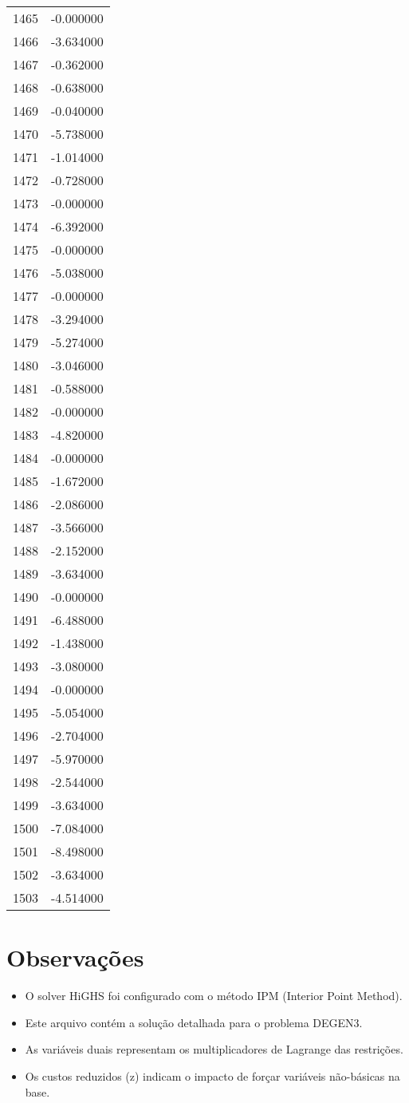 \documentclass[12pt]{article}
\begin{document}
\begin{longtable}{@{}cc@{}}
1465 & -0.000000 \\
1466 & -3.634000 \\
1467 & -0.362000 \\
1468 & -0.638000 \\
1469 & -0.040000 \\
1470 & -5.738000 \\
1471 & -1.014000 \\
1472 & -0.728000 \\
1473 & -0.000000 \\
1474 & -6.392000 \\
1475 & -0.000000 \\
1476 & -5.038000 \\
1477 & -0.000000 \\
1478 & -3.294000 \\
1479 & -5.274000 \\
1480 & -3.046000 \\
1481 & -0.588000 \\
1482 & -0.000000 \\
1483 & -4.820000 \\
1484 & -0.000000 \\
1485 & -1.672000 \\
1486 & -2.086000 \\
1487 & -3.566000 \\
1488 & -2.152000 \\
1489 & -3.634000 \\
1490 & -0.000000 \\
1491 & -6.488000 \\
1492 & -1.438000 \\
1493 & -3.080000 \\
1494 & -0.000000 \\
1495 & -5.054000 \\
1496 & -2.704000 \\
1497 & -5.970000 \\
1498 & -2.544000 \\
1499 & -3.634000 \\
1500 & -7.084000 \\
1501 & -8.498000 \\
1502 & -3.634000 \\
1503 & -4.514000 \\

\end{longtable}


\section{Observações}

\begin{itemize}
\item O solver HiGHS foi configurado com o método IPM (Interior Point Method).
\item Este arquivo contém a solução detalhada para o problema DEGEN3.
\item As variáveis duais representam os multiplicadores de Lagrange das restrições.
\item Os custos reduzidos (z) indicam o impacto de forçar variáveis não-básicas na base.
\end{itemize}
\end{document}
